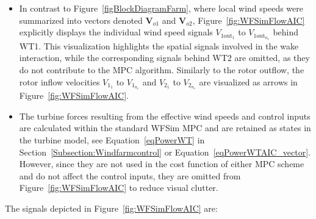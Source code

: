 \begin{itemize}
    \item In contrast to Figure~\ref{figBlockDiagramFarm}, where local wind speeds were summarized into vectors denoted $\bm{V}_{o1}$ and $\bm{V}_{o2}$, Figure~\ref{fig:WFSimFlowAIC} explicitly displays the individual wind speed signals $V_{1\text{out}_1}$ to $V_{1\text{out}_{n_r}}$ behind WT1. This visualization highlights the spatial signals involved in the wake interaction, while the corresponding signals behind WT2 are omitted, as they do not contribute to the MPC algorithm. Similarly to the rotor outflow, the rotor inflow velocities $V_{1_1}$ to $V_{1_{n_r}}$ and $V_{2_1}$ to $V_{2_{n_r}}$ are visualized as arrows in Figure~\ref{fig:WFSimFlowAIC}.
    \item The turbine forces resulting from the effective wind speeds and control inputs are calculated within the standard WFSim MPC and are retained as states in the turbine model, see Equation~\eqref{eqPowerWT} in Section~\ref{Subsection:Windfarmcontrol} or Equation~\eqref{eqPowerWTAIC_vector}. However, since they are not used in the cost function of either MPC scheme and do not affect the control inputs, they are omitted from Figure~\ref{fig:WFSimFlowAIC} to reduce visual clutter.
\end{itemize}
%
The signals depicted in Figure~\ref{fig:WFSimFlowAIC} are:
